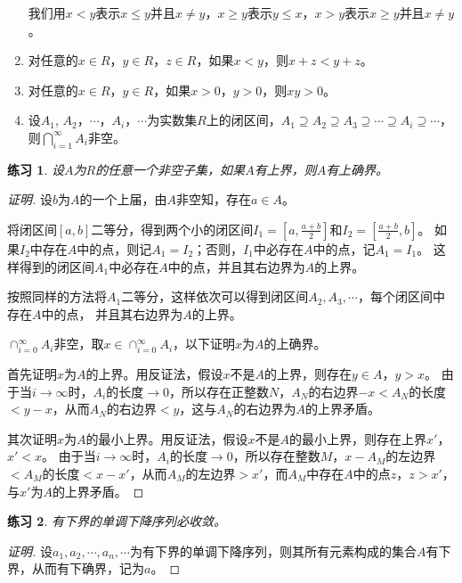 \documentclass{book}[oneside]
\newtheorem{Exercise}{练习}[chapter]
\begin{document}
\begin{CJK*}{UTF8}{gbsn}
\begin{enumerate}
  我们用$x<y$表示$x\leq y$并且$x\neq y$，$x\geq y$表示$y\leq x$，$x > y$表示$x\geq y$并且$x\neq y$。
  
  \item 对任意的$x\in R$，$y\in R$，$z\in R$，如果$x<y$，则$x+z<y+z$。
  \item 对任意的$x\in R$，$y\in R$，如果$x>0$，$y>0$，则$xy>0$。
  \item 设$A_1$, $A_2$，$\cdots$，$A_i$，$\cdots$为实数集$R$上的闭区间，$A_1\supseteq A_2 \supseteq A_3 \supseteq \cdots \supseteq A_i \supseteq \cdots$，则$\bigcap_{i=1}^{\infty}A_i$非空。
  \end{enumerate}

  \begin{Exercise}
    设$A$为$R$的任意一个非空子集，如果$A$有上界，则$A$有上确界。
  \end{Exercise}
  

\begin{proof}[证明]
  设$b$为$A$的一个上届，由$A$非空知，存在$a\in A$。

  将闭区间$[a,b]$二等分，得到两个小的闭区间$I_1=[a,\frac{a+b}{2}]$和$I_2=[\frac{a+b}{2}, b]$。
  如果$I_2$中存在$A$中的点，则记$A_1=I_2$；否则，$I_1$中必存在$A$中的点，记$A_1=I_1$。
  这样得到的闭区间$A_1$中必存在$A$中的点，并且其右边界为$A$的上界。

  按照同样的方法将$A_1$二等分，这样依次可以得到闭区间$A_2,A_3,\cdots$，每个闭区间中存在$A$中的点，
  并且其右边界为$A$的上界。

  $\cap_{i=0}^{\infty}A_i$非空，取$x\in \cap_{i=0}^{\infty}A_i$，以下证明$x$为$A$的上确界。

  首先证明$x$为$A$的上界。用反证法，假设$x$不是$A$的上界，则存在$y\in A$，$y> x$。
  由于当$i\to \infty$时，$A_i$的长度$\to 0$，所以存在正整数$N$，$A_N$的右边界$-x<A_N$的长度$<y-x$，从而$A_N$的右边界$<y$，这与$A_N$的右边界为$A$的上界矛盾。

  其次证明$x$为$A$的最小上界。用反证法，假设$x$不是$A$的最小上界，则存在上界$x'$，$x'<x$。
  由于当$i\to \infty$时，$A_i$的长度$\to 0$，所以存在整数$M$，$x-A_M$的左边界$<A_M$的长度$<x-x'$，从而$A_M$的左边界$>x'$，而$A_M$中存在$A$中的点$z$，$z>x'$，与$x'$为$A$的上界矛盾。
\end{proof}

  \begin{Exercise}
    有下界的单调下降序列必收敛。
  \end{Exercise}
  \begin{proof}[证明]
    设$a_1,a_2,\cdots,a_n,\cdots$为有下界的单调下降序列，则其所有元素构成的集合$A$有下界，从而有下确界，记为$a$。
  

\end{proof}
\end{CJK*}
\end{document}
